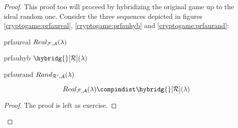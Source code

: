 \begin{proof}

    This proof too will proceed by hybridizing the original game up to the ideal random one. Consider the three sequences depicted in figures \ref{cryptogame:prfaureal}, \ref{cryptogame:prfauhyb} and \ref{cryptogame:prfaurand}:

    \begin{cryptogame}
        {prfaureal}
        {$Real_{\mathcal{F}, \mathcal{A}}(\lambda)$}
        {}


        \cseqbeginloop
        \cseqendloop
        
    \end{cryptogame}

    \begin{cryptogame}
        {prfauhyb}
        {$\hybridg{}[\R](\lambda)$}
        {}


        \cseqbeginloop
        \cseqendloop
        
    \end{cryptogame}

    \begin{cryptogame}
        {prfaurand}
        {$Rand_{\mathcal{R}', \mathcal{A}}(\lambda)$}
        {}


        \cseqbeginloop
        \cseqendloop
        
    \end{cryptogame}


    \begin{lemma}
        \[
            Real_{\F, \A}(\lambda) \compindist \hybridg{}[\R](\lambda)
        \]
    \end{lemma}

    \begin{proof}
        The proof is left as exercise.
    \end{proof}


\end{proof}
